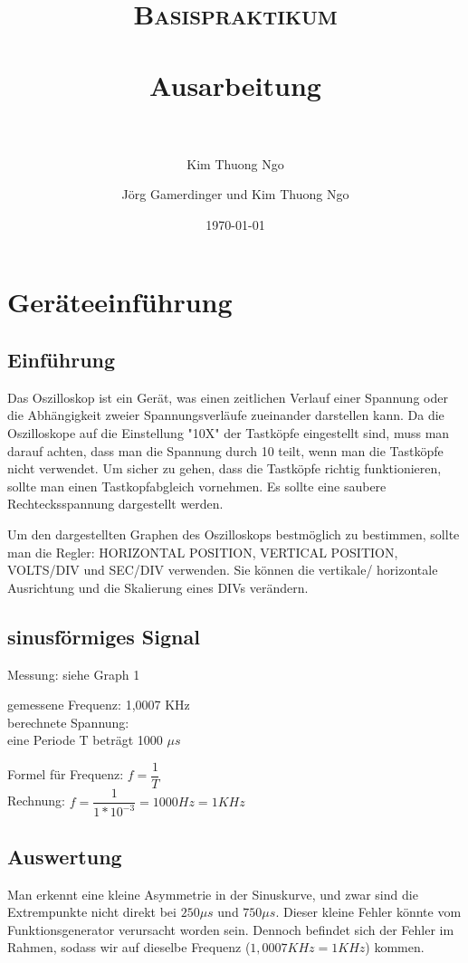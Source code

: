 \documentclass[paper=a4, fontsize=11pt]{scrartcl}
\author{Kim Thuong Ngo}
\title{	
\normalfont \normalsize 
\textsc{Basispraktikum} \\ [25pt] 
\horrule{0.5pt} \\[0.4cm] 
\huge Ausarbeitung \\ 
\horrule{2pt} \\[0.5cm] 
}
\author{Jörg Gamerdinger und Kim Thuong Ngo}
\date{\normalsize\today}
\numberwithin{equation}{section}
\numberwithin{figure}{section}
\numberwithin{table}{section}
\begin{document}
\maketitle 

\newpage

\tableofcontents

\newpage


\section{Geräteeinführung}

\subsection{Einführung}
Das Oszilloskop ist ein Gerät, was einen zeitlichen Verlauf einer Spannung oder die Abhängigkeit zweier Spannungsverläufe zueinander darstellen kann. Da die Oszilloskope auf die Einstellung "10X" der Tastköpfe eingestellt sind, muss man darauf achten, dass man die Spannung durch 10 teilt, wenn man die Tastköpfe nicht verwendet. Um sicher zu gehen, dass die Tastköpfe richtig funktionieren, sollte man einen Tastkopfabgleich vornehmen. Es sollte eine saubere Rechtecksspannung dargestellt werden.

Um den dargestellten Graphen des Oszilloskops bestmöglich zu bestimmen, sollte man die Regler: HORIZONTAL POSITION, VERTICAL POSITION, VOLTS/DIV und SEC/DIV verwenden. Sie können die vertikale/ horizontale Ausrichtung und die Skalierung eines DIVs verändern.

\subsection{sinusförmiges Signal}

Messung: siehe Graph 1 

gemessene Frequenz: 1,0007 KHz \\

berechnete Spannung: \\

eine Periode T beträgt 1000 $\mu s$

Formel für Frequenz: $f= \dfrac{1}{T}$ \\

Rechnung: $f = \dfrac{1}{1*10^{-3}} = 1000 Hz = 1 KHz$

\subsection{Auswertung}
Man erkennt eine kleine Asymmetrie in der Sinuskurve, und zwar sind die Extrempunkte nicht direkt bei $250 \mu s$ und $750 \mu s$. Dieser kleine Fehler könnte vom Funktionsgenerator verursacht worden sein. Dennoch befindet sich der Fehler im Rahmen, sodass wir auf dieselbe Frequenz ($1,0007 KHz = 1 KHz$) kommen.
\end{document}
